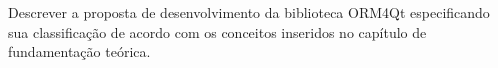 Descrever a proposta de desenvolvimento da biblioteca ORM4Qt especificando sua classificação de acordo com os conceitos inseridos no capítulo de fundamentação teórica.
